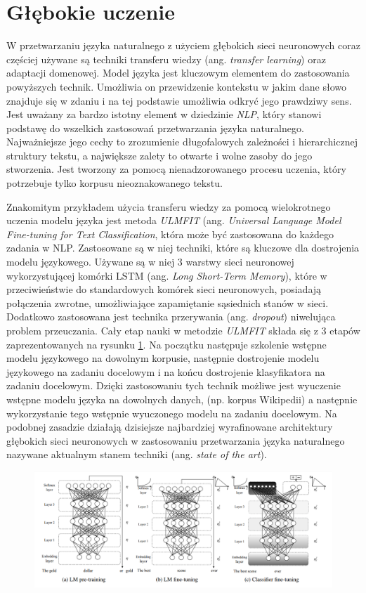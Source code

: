 \section{Głębokie uczenie}

W przetwarzaniu języka naturalnego z użyciem głębokich sieci neuronowych coraz częściej używane są techniki transferu wiedzy (ang. \textit{transfer learning}) oraz adaptacji domenowej. Model języka jest kluczowym elementem do zastosowania powyższych technik. Umożliwia on przewidzenie kontekstu w jakim dane słowo znajduje się w zdaniu i na tej podstawie umożliwia odkryć jego prawdziwy sens. Jest uważany za bardzo istotny element w dziedzinie \textit{NLP}, który stanowi podstawę do wszelkich zastosowań przetwarzania języka naturalnego. Najważniejsze jego cechy to zrozumienie długofalowych zależności i hierarchicznej struktury tekstu, a największe zalety to otwarte i wolne zasoby do jego stworzenia. Jest tworzony za pomocą nienadzorowanego procesu uczenia, który potrzebuje tylko korpusu nieoznakowanego tekstu.

Znakomitym przykładem użycia transferu wiedzy za pomocą wielokrotnego uczenia modelu języka jest metoda \textit{ULMFIT} \cite{howard2018universal} (ang. \textit{Universal Language Model Fine-tuning for Text Classification}, która może być zastosowana do każdego zadania w NLP. Zastosowane są w niej techniki, które są kluczowe dla dostrojenia modelu językowego. Używane są w niej 3 warstwy sieci neuronowej wykorzystującej komórki LSTM (ang. \textit{Long Short-Term Memory}), które w przeciwieństwie do standardowych komórek sieci neuronowych, posiadają połączenia zwrotne, umożliwiające zapamiętanie sąsiednich stanów w sieci. Dodatkowo zastosowana jest technika przerywania (ang. \textit{dropout}) niwelująca problem przeuczania. Cały etap nauki w metodzie \textit{ULMFIT} składa się z 3 etapów zaprezentowanych na rysunku \ref{rys:ulmfit}. Na początku następuje szkolenie wstępne modelu językowego na dowolnym korpusie, następnie dostrojenie modelu językowego na zadaniu docelowym i na końcu dostrojenie klasyfikatora na zadaniu docelowym. Dzięki zastosowaniu tych technik możliwe jest wyuczenie wstępne modelu języka na dowolnych danych, (np. korpus Wikipedii) a następnie wykorzystanie tego wstępnie wyuczonego modelu na zadaniu docelowym. Na podobnej zasadzie działają dzisiejsze najbardziej wyrafinowane architektury głębokich sieci neuronowych w zastosowaniu przetwarzania języka naturalnego nazywane aktualnym stanem techniki (ang. \textit{state of the art}).

\begin{figure}[t]
\centering\includegraphics[width=\textwidth]{figures/ulmfit.png}
\label{rys:ulmfit}
\end{figure}
